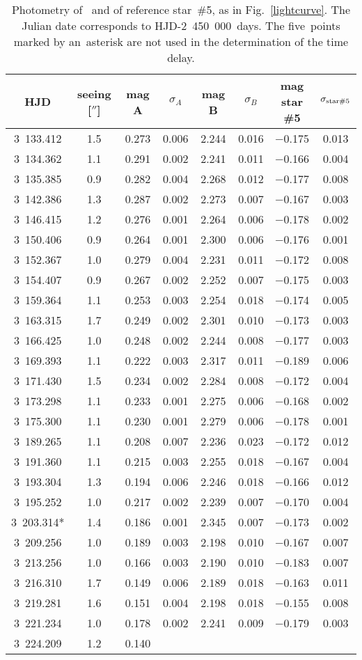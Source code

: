 \begin{table}%
\caption{Photometry of \obj\ and of reference star~\#5, as in Fig.~\ref{lightcurve}. The Julian date corresponds to HJD-2~450~000~days. The five~points marked by an~asterisk are not used in the determination of the time delay.} 
\label{data} %
\centering \small 
\begin{tabular}{cccccccc} 
\hline\hline HJD & seeing [$''$] & mag A & $\sigma_A$ & mag B & $\sigma_B$ & mag star \#5 & $\sigma_{\rm star \#5}$ \\ \hline 3~133.412 & 1.5 & 0.273 & 0.006 & 2.244 & 0.016 & $-$0.175 & 0.013 \\ 3~134.362 & 1.1 & 0.291 & 0.002 & 2.241 & 0.011 & $-$0.166 & 0.004 \\ 3~135.385 & 0.9 & 0.282 & 0.004 & 2.268 & 0.012 & $-$0.177 & 0.008 \\ 3~142.386 & 1.3 & 0.287 & 0.002 & 2.273 & 0.007 & $-$0.167 & 0.003 \\ 3~146.415 & 1.2 & 0.276 & 0.001 & 2.264 & 0.006 & $-$0.178 & 0.002 \\ 3~150.406 & 0.9 & 0.264 & 0.001 & 2.300 & 0.006 & $-$0.176 & 0.001 \\ 3~152.367 & 1.0 & 0.279 & 0.004 & 2.231 & 0.011 & $-$0.172 & 0.008 \\ 3~154.407 & 0.9 & 0.267 & 0.002 & 2.252 & 0.007 & $-$0.175 & 0.003 \\ 3~159.364 & 1.1 & 0.253 & 0.003 & 2.254 & 0.018 & $-$0.174 & 0.005 \\ 3~163.315 & 1.7 & 0.249 & 0.002 & 2.301 & 0.010 & $-$0.173 & 0.003 \\ 3~166.425 & 1.0 & 0.248 & 0.002 & 2.244 & 0.008 & $-$0.177 & 0.003 \\ 3~169.393 & 1.1 & 0.222 & 0.003 & 2.317 & 0.011 & $-$0.189 & 0.006 \\ 3~171.430 & 1.5 & 0.234 & 0.002 & 2.284 & 0.008 & $-$0.172 & 0.004 \\ 3~173.298 & 1.1 & 0.233 & 0.001 & 2.275 & 0.006 & $-$0.168 & 0.002 \\ 3~175.300 & 1.1 & 0.230 & 0.001 & 2.279 & 0.006 & $-$0.178 & 0.001 \\ 3~189.265 & 1.1 & 0.208 & 0.007 & 2.236 & 0.023 & $-$0.172 & 0.012 \\ 3~191.360 & 1.1 & 0.215 & 0.003 & 2.255 & 0.018 & $-$0.167 & 0.004 \\ 3~193.304 & 1.3 & 0.194 & 0.006 & 2.246 & 0.018 & $-$0.166 & 0.012 \\ 3~195.252 & 1.0 & 0.217 & 0.002 & 2.239 & 0.007 & $-$0.170 & 0.004 \\ 3~203.314* & 1.4 & 0.186 & 0.001 & 2.345 & 0.007 & $-$0.173 & 0.002 \\ 3~209.256 & 1.0 & 0.189 & 0.003 & 2.198 & 0.010 & $-$0.167 & 0.007 \\ 3~213.256 & 1.0 & 0.166 & 0.003 & 2.190 & 0.010 & $-$0.183 & 0.007 \\ 3~216.310 & 1.7 & 0.149 & 0.006 & 2.189 & 0.018 & $-$0.163 & 0.011 \\ 3~219.281 & 1.6 & 0.151 & 0.004 & 2.198 & 0.018 & $-$0.155 & 0.008 \\ 3~221.234 & 1.0 & 0.178 & 0.002 & 2.241 & 0.009 & $-$0.179 & 0.003 \\ 3~224.209 & 1.2 & 0.140 & 
\end{tabular}
\end{table}
